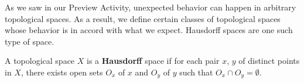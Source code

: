 \begin{comment}
Spaces in which single point sets are not closed, or in which sequences can converge to more than one point, do not generally occur in applications. Also, this type of behavior limits the results that one can prove about such spaces. As a result, we define classes of topological spaces whose behaviors are closer to what our intuition suggests. One such class is the following.

\begin{definition} A topological space $X$ is a \textbf{Hausdorff} space if for each pair $x$, $y$ of distinct points in $X$, there exists open sets $O_x$ of $x$ and $O_y$ of $y$ such that $O_x \cap O_y = \emptyset$. 
\end{definition}
In other words, a topological space is Hausdorff if we can separate distinct points with disjoint open sets.

\item 
	\ba
	\item Let $(X, d)$ be a metric space and let $x$ and $y$ be distinct elements of $X$. Is it possible to find disjoint open balls $B_x$ and $B_y$ centered at $x$ and $y$, respectively? Why or why not? Is every metric space Hausdorff?
	
	
	\item Consider $(\R, \tau_{FC})$, where $\tau_{FC}$ is the finite complement topology. Let $x$ and $y$ be distinct elements of $\R$. Suppose $O_x$ is an open set in $\R$ that contains $x$ and $O_y$ an open set in $\R$ that contains $y$. What can we say about $O_x \cap O_y$? Explain. Is $(\R, \tau_{FC})$ Hausdorff?
	
Solution. We know that $O_x \cap O_y$ is an open set, so $\R \setminus (O_x \cap O_y)$ is finite. Therefore, $O_x \cap O_y \neq \emptyset$. It follows that $(\R, \tau_{FC})$ is not Hausdorff.
		\ea
\ee


\end{comment}



As we saw in our Preview Activity, unexpected behavior can happen in arbitrary topological spaces. As a result, we define certain classes of topological spaces whose behavior is in accord with what we expect. Hausdorff spaces are one such type of space. 



\begin{definition} A topological space $X$ is a \textbf{Hausdorff} space if for each pair $x$, $y$ of distinct points in $X$, there exists open sets  $O_x$ of $x$ and $O_y$ of $y$ such that $O_x \cap O_y = \emptyset$.
\end{definition}



